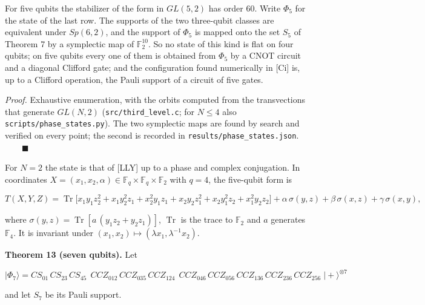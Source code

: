 \documentclass[11pt,a4paper]{article}
\begin{document}
For five qubits the stabilizer of the form in \(GL(5,2)\) has order 60. Write \(\Phi_5\) for the state of the
last row. The supports of the two three-qubit classes are equivalent under \(Sp(6,2)\), and the support
of \(\Phi_5\) is mapped onto the set \(S_5\) of Theorem 7 by a symplectic map of \(\mathbb{F}_2^{10}\). So no
state of this kind is flat on four qubits; on five qubits every one of them is obtained from \(\Phi_5\) by
a CNOT circuit and a diagonal Clifford gate; and the configuration found numerically in {[}Ci{]} is, up to a
Clifford operation, the Pauli support of a circuit of five gates.

\emph{Proof.} Exhaustive enumeration, with the orbits computed from the transvections that generate
\(GL(N,2)\) (\texttt{src/third\_level.c}; for \(N \le 4\) also \texttt{scripts/phase\_states.py}). The two symplectic maps
are found by search and verified on every point; the second is recorded in \texttt{results/phase\_states.json}.
\(\qquad\blacksquare\)

For \(N = 2\) the state is that of {[}LLY{]} up to a phase and complex conjugation. In coordinates
\(X = (x_1, x_2, \alpha) \in \mathbb{F}_q \times \mathbb{F}_q \times \mathbb{F}_2\) with \(q = 4\), the
five-qubit form is

\[T(X,Y,Z) = \operatorname{Tr}\big[x_1y_1z_2^2 + x_1y_2^2z_1 + x_2^2y_1z_1 + x_2y_2z_1^2 + x_2y_1^2z_2 + x_1^2y_2z_2\big]
 + \alpha\,\sigma(y,z) + \beta\,\sigma(x,z) + \gamma\,\sigma(x,y),\]

where \(\sigma(y,z) = \operatorname{Tr}[a\,(y_1z_2 + y_2z_1)]\), \(\operatorname{Tr}\) is the trace to
\(\mathbb{F}_2\) and \(a\) generates \(\mathbb{F}_4\). It is invariant under \((x_1, x_2) \mapsto (\lambda x_1, \lambda^{-1}x_2)\).

\textbf{Theorem 13 (seven qubits).} Let

\[|\Phi_7\rangle = CS_{01}\,CS_{23}\,CS_{45}\;\, CCZ_{012}\,CCZ_{035}\,CCZ_{124}\;\, CCZ_{046}\,CCZ_{056}\,CCZ_{136}\,CCZ_{236}\,CCZ_{256}\; |{+}\rangle^{\otimes 7}\]

and let \(S_7\) be its Pauli support.
\end{document}
